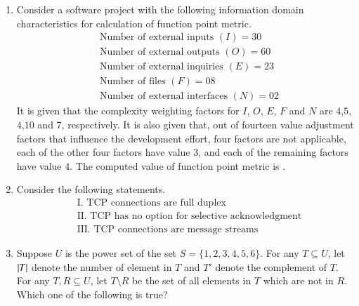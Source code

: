 \documentclass[journal,12pt,onecolumn]{IEEEtran}
\theoremstyle{remark}
\begin{document}
\begin{enumerate}
		\hfill{}
		
		\item Consider a software project with the following information domain characteristics for calculation of function point metric.
		\begin{align*}
			&\text{Number of external inputs } (I) = 30\\
			&\text{Number of external outputs } (O) = 60\\
			&\text{Number of external inquiries } (E) = 23\\
			&\text{Number of files } (F) = 08\\
			&\text{Number of external interfaces } (N) = 02
		\end{align*}
		It is given that the complexity weighting factors for $I$, $O$, $E$, $F$ and $N$ are $4$,$5$,$4$,$10$ and $7$, respectively. It is also given that, out of fourteen value adjustment factors that influence the development effort, four factors are not applicable, each of the other four factors have value $3$, and each of the remaining factors have value $4$. The computed value of function point metric is \underline{\hspace{2cm}}.
		
		\hfill{}
		
		\item Consider the following statements.
		\begin{align*}
			&\text{I. TCP connections are full duplex}\\
			&\text{II. TCP has no option for selective acknowledgment}\\
			&\text{III. TCP connections are message streams}
		\end{align*}
		
		\hfill{}
		
		\begin{enumerate}
		\end{enumerate}
		
		\item Suppose $U$ is the power set of the set $S = \{1,2,3,4,5,6\}$. For any $T \subseteq U$, let $\left\vert T\right\vert$ denote the number of element in $T$ and $T'$ denote the complement of $T$. For any $T,R \subseteq U$, let $T \setminus R$ be the set of all elements in $T$ which are not in $R$. Which one of the following is true?
		

\end{enumerate}
\end{document}
